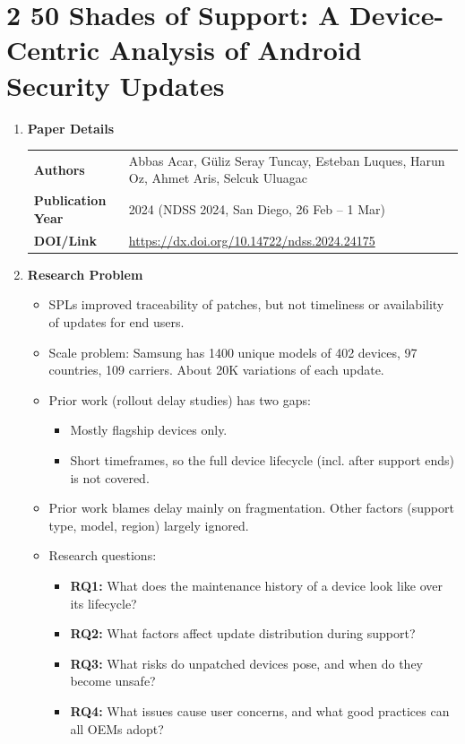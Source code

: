 \documentclass[11pt,a4paper]{article}
\newcommand{\entrypart}[1]{\textbf{\color{accent}#1}\par\vspace{2pt}}
\begin{document}
\newpage

\section{2 50 Shades of Support: A Device-Centric Analysis of Android Security Updates}

\begin{enumerate}

    \item \entrypart{Paper Details}

    \begin{tabular}{@{}>{\bfseries}p{3.2cm} p{11.5cm}@{}}
        Authors          & Abbas Acar, G\"uliz Seray Tuncay, Esteban Luques, Harun Oz, Ahmet Aris, Selcuk Uluagac \\[2pt]
        Publication Year & 2024 (NDSS 2024, San Diego, 26 Feb -- 1 Mar) \\[2pt]
        DOI/Link         & \url{https://dx.doi.org/10.14722/ndss.2024.24175}
    \end{tabular}

    \item \entrypart{Research Problem}

    \begin{itemize}
        \item SPLs improved traceability of patches, but not timeliness or availability of updates for end users.
        \item Scale problem: Samsung has 1400 unique models of 402 devices, 97 countries, 109 carriers. About 20K variations of each update.
        \item Prior work (rollout delay studies) has two gaps:
        \begin{itemize}
            \item Mostly flagship devices only.
            \item Short timeframes, so the full device lifecycle (incl. after support ends) is not covered.
        \end{itemize}
        \item Prior work blames delay mainly on fragmentation. Other factors (support type, model, region) largely ignored.
        \item Research questions:
        \begin{itemize}
            \item \textbf{RQ1:} What does the maintenance history of a device look like over its lifecycle?
            \item \textbf{RQ2:} What factors affect update distribution during support?
            \item \textbf{RQ3:} What risks do unpatched devices pose, and when do they become unsafe?
            \item \textbf{RQ4:} What issues cause user concerns, and what good practices can all OEMs adopt?
        \end{itemize}
    \end{itemize}


\end{enumerate}
\end{document}
